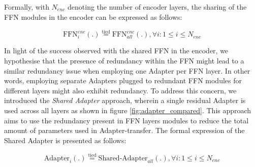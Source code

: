 Formally, with $N_{enc}$ denoting the number of encoder layers, the sharing of the FFN modules in the encoder can be expressed as follows:

\begin{equation}
    \text{FFN}_{i}^{enc}(.) \stackrel{\text{tied}}{=} \text{FFN}^{enc}_{all}(.) , \forall i: 1 \leq i \leq N_{enc}
\end{equation}

In light of the success observed with the shared FFN in the encoder, we hypothesise that the presence of redundancy within the FFN might lead to a similar redundancy issue when employing one Adapter per FFN layer. In other words, employing separate Adapters plugged to redundant FFN modules for different layers might also exhibit redundancy. To address this concern, we introduced the \textit{Shared Adapter} approach, wherein a single residual Adapter is used across all layers as shown in figure \ref{fig:adapter_compared}. This approach aims to use the redundancy present in FFN layers modules to reduce the total amount of parameters used in Adapter-transfer. The formal expression of the Shared Adapter is presented as follows:

\begin{equation}
    \text{Adapter}_{i}(.) \stackrel{\text{tied}}{=} \text{Shared-Adapter}_{all}(.) , \forall i: 1 \leq i \leq N_{enc}
\end{equation}

